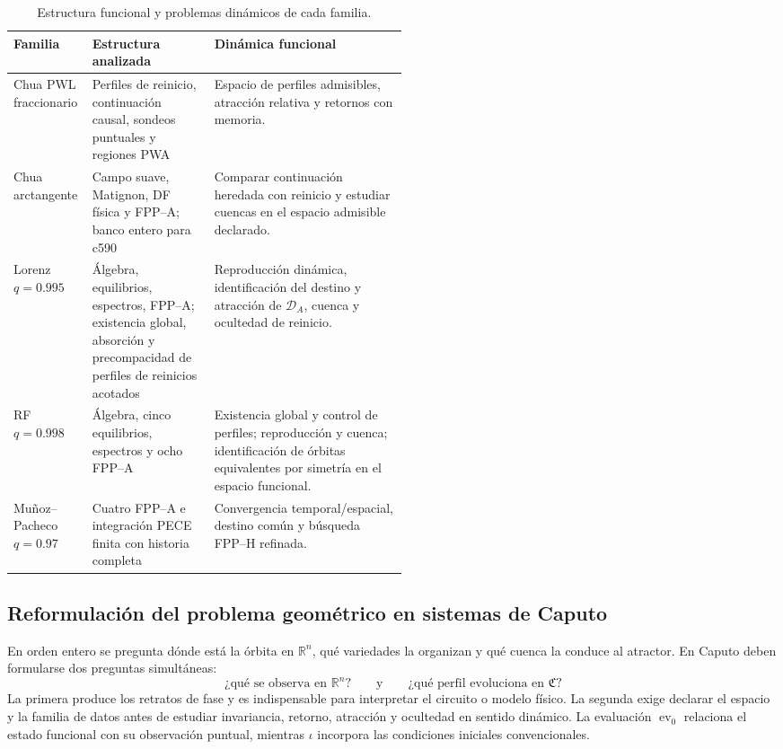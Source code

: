 \begin{table}[ht]
\centering
\small
\caption{Estructura funcional y problemas dinámicos de cada familia.}
\label{tab:geofo-case-program}
\begin{tabularx}{\linewidth}{@{}L{0.20\linewidth}L{0.31\linewidth}Y@{}}
\toprule
Familia & Estructura analizada & Dinámica funcional \\
\midrule
Chua PWL fraccionario & Perfiles de reinicio, continuación causal, sondeos
puntuales y regiones PWA & Espacio de perfiles admisibles, atracción relativa
y retornos con memoria.\\
Chua arctangente & Campo suave, Matignon, DF física y FPP--A; banco entero para c590 &
Comparar continuación heredada con reinicio y estudiar cuencas en el espacio
admisible declarado.\\
Lorenz \(q=0.995\) & Álgebra, equilibrios, espectros, FPP--A; existencia
global, absorción y precompacidad de perfiles de reinicios acotados &
Reproducción dinámica, identificación del destino y atracción de
\(\mathcal D_A\), cuenca y ocultedad de reinicio.\\
RF \(q=0.998\) & Álgebra, cinco equilibrios, espectros y ocho FPP--A &
Existencia global y control de perfiles; reproducción y cuenca; identificación de órbitas equivalentes
por simetría en el espacio funcional.\\
Muñoz--Pacheco \(q=0.97\) & Cuatro FPP--A e integración PECE finita con historia completa &
Convergencia temporal/espacial, destino común y búsqueda FPP--H refinada.\\
\bottomrule
\end{tabularx}
\end{table}

\subsection{Reformulación del problema geométrico en sistemas de Caputo}

En orden entero se pregunta dónde está la órbita en \(\mathbb R^n\), qué
variedades la organizan y qué cuenca la conduce al atractor. En Caputo deben
formularse dos preguntas simultáneas:
\begin{equation}
 \text{¿qué se observa en }\mathbb R^n?
 \qquad\text{y}\qquad
 \text{¿qué perfil evoluciona en }\mathfrak C?
 \label{eq:geofo-two-geometric-questions}
\end{equation}
La primera produce los retratos de fase y es indispensable para interpretar el
circuito o modelo físico. La segunda exige declarar el espacio y la familia
de datos antes de estudiar invariancia, retorno, atracción y ocultedad en
sentido dinámico. La evaluación
\(\operatorname{ev}_0\) relaciona el estado funcional con su observación
puntual, mientras \(\iota\) incorpora las condiciones iniciales convencionales.

